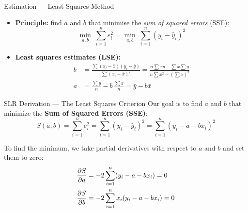\documentclass[12pt, aspectratio=169]{beamer}
\begin{document}
    \begin{frame}{Estimation --- Least Squares Method}
        \begin{itemize}
            \item \textbf{Principle:} find $a$ and $b$ that minimise the
                \emph{sum of squared errors} (SSE):
                \[
                    \min_{a,b}\;\sum_{i=1}^{n} e_i^2
                    = \min_{a,b}\;\sum_{i=1}^{n}(y_i - \hat{y}_i)^2
                \]
            \item \textbf{Least squares estimates (LSE):}
                \begin{align*}
                    b &= \frac{\sum (x_i - \bar{x})(y_i - \bar{y})}{\sum (x_i - \bar{x})^2} = \frac{n\sum xy - \sum x \sum y}{n\sum x^2 - (\sum x)^2} \\[10pt]
                    a &= \frac{\sum y}{n} - b\,\frac{\sum x}{n} = \bar{y} - b\bar{x}
                \end{align*}
        \end{itemize}
    \end{frame}


    \begin{frame}{SLR Derivation --- The Least Squares Criterion}
        Our goal is to find $a$ and $b$ that minimize the \textbf{Sum of Squared Errors (SSE)}:
        \begin{equation*}
            S(a, b) = \sum_{i=1}^{n} e_i^2 = \sum_{i=1}^{n} (y_i - \hat{y}_i)^2 = \sum_{i=1}^{n} (y_i - a - bx_i)^2
        \end{equation*}

        To find the minimum, we take partial derivatives with respect to $a$ and $b$ and set them to zero:
        \begin{align}
            \frac{\partial S}{\partial a} &= -2 \sum_{i=1}^{n} (y_i - a - bx_i) = 0 \notag \\
            \frac{\partial S}{\partial b} &= -2 \sum_{i=1}^{n} x_i (y_i - a - bx_i) = 0 \label{eq:deriv2}
        \end{align}
    \end{frame}
\end{document}

